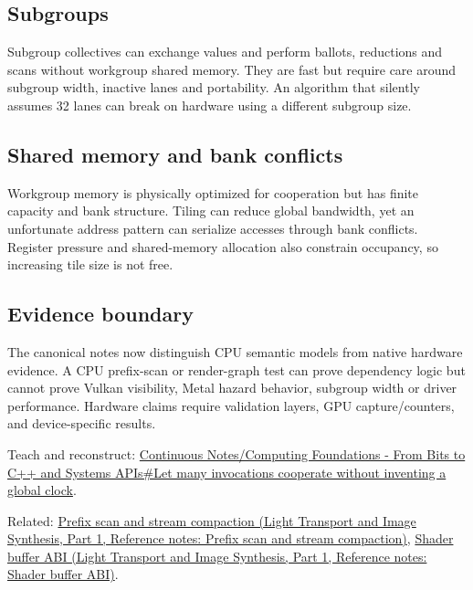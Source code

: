 \subsection{Subgroups}\label{appendix-f662b5b1773b-subgroups}

\hypertarget{appendix-f662b5b1773b-subgroups}{}

Subgroup collectives can exchange values and perform ballots, reductions and scans without workgroup shared memory. They are fast but require care around subgroup width, inactive lanes and portability. An algorithm that silently assumes 32 lanes can break on hardware using a different subgroup size.

\subsection{Shared memory and bank conflicts}\label{appendix-f662b5b1773b-shared-memory-and-bank-conflicts}

\hypertarget{appendix-f662b5b1773b-shared-memory-and-bank-conflicts}{}

Workgroup memory is physically optimized for cooperation but has finite capacity and bank structure. Tiling can reduce global bandwidth, yet an unfortunate address pattern can serialize accesses through bank conflicts. Register pressure and shared-memory allocation also constrain occupancy, so increasing tile size is not free.

\subsection{Evidence boundary}\label{appendix-f662b5b1773b-evidence-boundary}

\hypertarget{appendix-f662b5b1773b-evidence-boundary}{}

The canonical notes now distinguish CPU semantic models from native hardware evidence. A CPU prefix-scan or render-graph test can prove dependency logic but cannot prove Vulkan visibility, Metal hazard behavior, subgroup width or driver performance. Hardware claims require validation layers, GPU capture/counters, and device-specific results.

Teach and reconstruct: \hyperref[01-foundations-i-ch008-let-many-invocations-cooperate-without-inventing-a-global-clock]{Continuous Notes/Computing Foundations - From Bits to C++ and Systems APIs\#Let many invocations cooperate without inventing a global clock}.

Related: \href{../04-Light-Transport-and-Image-Synthesis-P01/main.pdf\#nameddest=appendix-f2ee4d086415}{Prefix scan and stream compaction (Light Transport and Image Synthesis, Part 1, Reference notes: Prefix scan and stream compaction)}, \href{../04-Light-Transport-and-Image-Synthesis-P01/main.pdf\#nameddest=appendix-749048795dbb}{Shader buffer ABI (Light Transport and Image Synthesis, Part 1, Reference notes: Shader buffer ABI)}.
